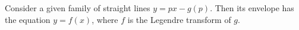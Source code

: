 Consider a given family of straight lines $y = px - g(p)$. Then its envelope has the equation $y = f(x)$, where $f$ is the Legendre transform of $g$.
